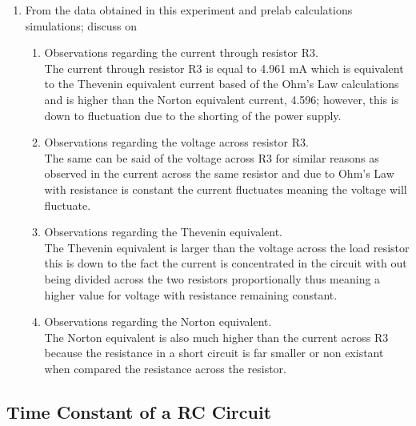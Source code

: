 \documentclass[a4paper]{article}
\begin{document}
\begin{enumerate}
    \item From the data obtained in this experiment and prelab calculations simulations; discuss on\\
    \begin{enumerate}
        \item Observations regarding the current through resistor R3.\\
        The current through resistor R3 is equal to 4.961 mA which is equivalent to the Thevenin equivalent current based of the Ohm's Law calculations and is higher than the Norton equivalent current, 4.596; however, this is down to fluctuation due to the shorting of the power supply.
        \item Observations regarding the voltage across resistor R3.\\
        The same can be said of the voltage across R3 for similar reasons as observed in the current across the same resistor and due to Ohm's Law with resistance is constant the current fluctuates meaning the voltage will fluctuate. 
        \item Observations regarding the Thevenin equivalent.\\
        The Thevenin equivalent is larger than the voltage across the load resistor this is down to the fact the current is concentrated in the circuit with out being divided across the two resistors proportionally thus meaning a higher value for voltage with resistance remaining constant.
        \item Observations regarding the Norton equivalent.\\
        The Norton equivalent is also much higher than the current across R3 because the resistance in a short circuit is far smaller or non existant when compared the resistance across the resistor.  
    \end{enumerate}
\end{enumerate}

\subsection{Time Constant of a RC Circuit}
\end{document}
